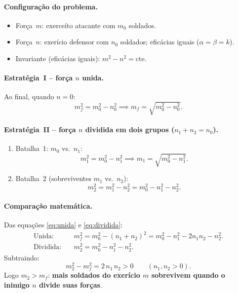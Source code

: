 \documentclass[12pt,a4paper]{article}
\theoremstyle{definition}
\begin{document}
\paragraph{Configura\c{c}\~ao do problema.}
\begin{itemize}
  \item For\c{c}a~$m$: exerce\'ito atacante com $m_0$ soldados.
  \item For\c{c}a~$n$: exer\'icio defensor com $n_0$ soldados; efic\'acias iguais
        ($\alpha = \beta = k$).
  \item Invariante (efic\'acias iguais): $m^2 - n^2 = \text{cte.}$
\end{itemize}

\paragraph{Estrat\'egia~I -- for\c{c}a $n$ unida.}
Ao final, quando $n = 0$:
\begin{equation}
  m_f^2 = m_0^2 - n_0^2 \implies m_f = \sqrt{m_0^2 - n_0^2}.
  \label{eq:unida}
\end{equation}

\paragraph{Estrat\'egia~II -- for\c{c}a $n$ dividida em dois grupos ($n_1 + n_2 = n_0$).}
\begin{enumerate}[label=\arabic*)]
  \item Batalha~1: $m_0$ vs.\ $n_1$:
    \begin{equation}
      m_1^2 = m_0^2 - n_1^2 \implies m_1 = \sqrt{m_0^2 - n_1^2}.
    \end{equation}
  \item Batalha~2 (sobreviventes $m_1$ vs.\ $n_2$):
    \begin{equation}
      m_2^2 = m_1^2 - n_2^2 = m_0^2 - n_1^2 - n_2^2.
      \label{eq:dividida}
    \end{equation}
\end{enumerate}

\paragraph{Compara\c{c}\~ao matem\'atica.}
Das equa\c{c}\~oes \eqref{eq:unida} e \eqref{eq:dividida}:
\begin{align}
  \text{Unida:}   \quad & m_f^2   = m_0^2 - (n_1+n_2)^2
                                   = m_0^2 - n_1^2 - 2n_1n_2 - n_2^2. \\[4pt]
  \text{Dividida:}\quad & m_2^2   = m_0^2 - n_1^2 - n_2^2.
\end{align}
Subtraindo:
\begin{equation}
  m_2^2 - m_f^2 = 2\,n_1\,n_2 > 0 \qquad (n_1, n_2 > 0).
\end{equation}
Logo $m_2 > m_f$: \textbf{mais soldados do exer\'icio $m$ sobrevivem quando o inimigo
$n$ divide suas for\c{c}as}.
\end{document}
